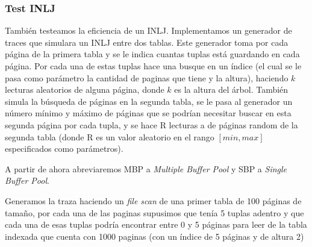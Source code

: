 \subsubsection{Test INLJ}
También testeamos la eficiencia de un INLJ. Implementamos un generador de traces que simulara un INLJ entre dos tablas.
Este generador toma por cada página de la primera tabla y se le indica cuantas tuplas está guardando en cada página. 
Por cada una de estas tuplas hace una busque en un índice (el cual se le pasa como  parámetro la cantidad de paginas
que tiene y la altura), haciendo $k$ lecturas aleatorios de alguna página, donde $k$ es la altura del árbol. También simula
la búsqueda de páginas en la segunda tabla, se le pasa al generador un número mínimo y máximo de páginas que se 
podrían necesitar buscar en esta segunda página por cada tupla, y se hace R lecturas a de páginas random de la
segunda tabla (donde R es un valor aleatorio en el rango $[min,max]$ especificados como parámetros).

A partir de ahora abreviaremos MBP a \textit{Multiple Buffer Pool} y SBP a \textit{Single Buffer Pool}.

Generamos la traza haciendo un \textit{file scan} de una primer tabla de 100 páginas de tama\~{n}o, por cada una de las paginas
supusimos que tenía 5 tuplas adentro y que cada una de esas tuplas podría encontrar entre 0 y 5 páginas
para leer de la tabla indexada que cuenta con 1000 paginas (con un índice de 5 páginas y de altura 2)

